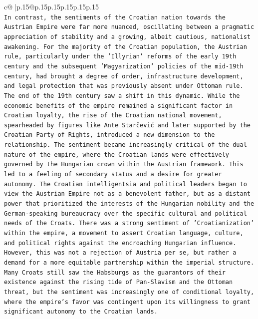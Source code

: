 \documentclass{article}
\begin{document}
{\begin{supertabular}{c@{$\;$}|p{.15\linewidth}@{}p{.15\linewidth}p{.15\linewidth}p{.15\linewidth}p{.15\linewidth}p{.15\linewidth}}
{{{\\ 
\texttt{In contrast, the sentiments of the Croatian nation towards the Austrian Empire were far more nuanced, oscillating between a pragmatic appreciation of stability and a growing, albeit cautious, nationalist awakening. For the majority of the Croatian population, the Austrian rule, particularly under the 'Illyrian' reforms of the early 19th century and the subsequent 'Magyarization' policies of the mid{-}19th century, had brought a degree of order, infrastructure development, and legal protection that was previously absent under Ottoman rule. The end of the 19th century saw a shift in this dynamic. While the economic benefits of the empire remained a significant factor in Croatian loyalty, the rise of the Croatian national movement, spearheaded by figures like Ante Starčević and later supported by the Croatian Party of Rights, introduced a new dimension to the relationship. The sentiment became increasingly critical of the dual nature of the empire, where the Croatian lands were effectively governed by the Hungarian crown within the Austrian framework. This led to a feeling of secondary status and a desire for greater autonomy. The Croatian intelligentsia and political leaders began to view the Austrian Empire not as a benevolent father, but as a distant power that prioritized the interests of the Hungarian nobility and the German{-}speaking bureaucracy over the specific cultural and political needs of the Croats. There was a strong sentiment of 'Croatianization' within the empire, a movement to assert Croatian language, culture, and political rights against the encroaching Hungarian influence. However, this was not a rejection of Austria per se, but rather a demand for a more equitable partnership within the imperial structure. Many Croats still saw the Habsburgs as the guarantors of their existence against the rising tide of Pan{-}Slavism and the Ottoman threat, but the sentiment was increasingly one of conditional loyalty, where the empire's favor was contingent upon its willingness to grant significant autonomy to the Croatian lands.} \\
\\ 
}}}
\end{supertabular}}
\end{document}
